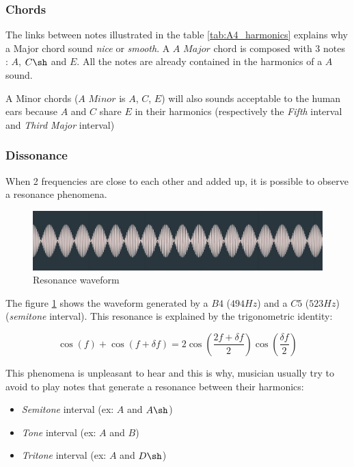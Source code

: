 \documentclass[12pt]{report}
\begin{document}
\subsubsection{Chords}

The links between notes illustrated in the table \ref{tab:A4_harmonics} explains why a Major chord sound \textit{nice} or \textit{smooth}.
A $A$ $Major$ chord is composed with 3 notes : $A$, $C\sh$ and $E$. All the notes are already contained in the harmonics of a $A$ sound.

A Minor chords ($A$ $Minor$ is $A$, $C$, $E$) will also sounds acceptable to the human ears because $A$ and $C$ share $E$ in their harmonics (respectively the \textit{Fifth} interval and \textit{Third Major} interval) 

\subsubsection{Dissonance}

When 2 frequencies are close to each other and added up, it is possible to observe a resonance phenomena.

\begin{figure}[H]
    \centering
    \includegraphics[width=\textwidth]{images/music/waveform/resonance.jpg}
    \caption{Resonance waveform}
    \label{fig:resonance}
\end{figure}
The figure \ref{fig:resonance} shows the waveform generated by a $B4$ ($494Hz$) and a $C5$ ($523Hz$) (\textit{semitone} interval).
This resonance is explained by the trigonometric identity:

\begin{equation}
    \cos(f) + \cos(f + \delta f) = 2 \cos(\frac{2f + \delta f}{2}) \cos(\frac{\delta f}{2})
\end{equation}

This phenomena is unpleasant to hear and this is why, musician usually try to avoid to play notes that generate a resonance between their harmonics:
\begin{itemize}
    \item \textit{Semitone} interval (ex: $A$ and $A\sh$)
    \item \textit{Tone} interval (ex: $A$ and $B$)
    \item \textit{Tritone} interval (ex: $A$ and $D\sh$)
\end{itemize}
\end{document}
